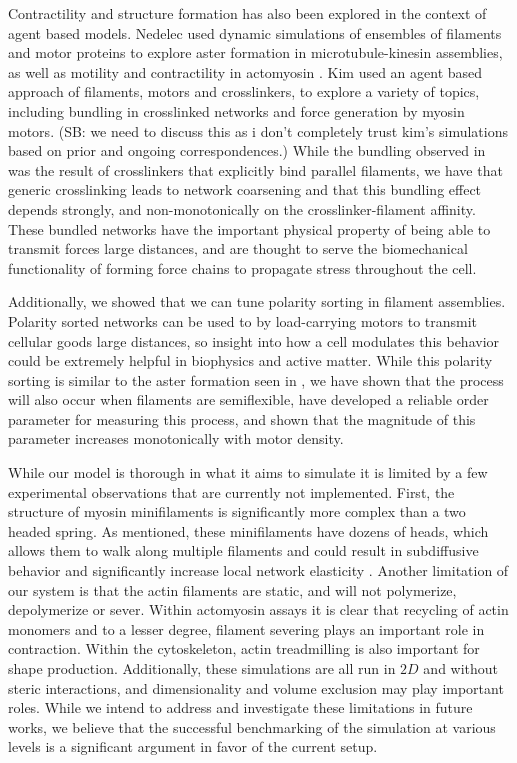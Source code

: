 \documentclass[11pt]{article}
\begin{document}
\par
Contractility and structure formation has also been explored in the context of agent based models. 
Nedelec used dynamic simulations of ensembles of filaments and motor proteins
to explore aster formation in microtubule-kinesin assemblies, as well as motility and contractility in actomyosin
\cite{nedelec2002,nedelec2007,ennomani2016}. 
Kim used an agent based approach of filaments, motors and crosslinkers, to explore a variety of topics, 
including bundling in crosslinked networks and force generation by myosin motors\cite{kim2009b, kim2014}. {\color{blue} (SB: we need to discuss this as i don't completely trust kim's simulations based on prior and ongoing correspondences.)}
While the bundling observed in \cite{kim2009b} was the result of crosslinkers that explicitly bind parallel filaments, 
we have that generic crosslinking leads to network coarsening and that this bundling effect depends strongly, 
and non-monotonically on the crosslinker-filament affinity. These bundled networks have the important physical property of being 
able to transmit forces large distances, and are thought to serve the biomechanical functionality 
of forming force chains to propagate stress throughout the cell. 

\par
Additionally, we showed that we can tune polarity sorting in filament assemblies. 
Polarity sorted networks can be used to by load-carrying motors to 
transmit cellular goods large distances, so insight into how a cell modulates this behavior could be extremely
helpful in biophysics and active matter. While this polarity sorting is similar to the aster formation seen in
\cite{nedelec2002,gordon2012}, we have shown that the process will also occur when filaments are semiflexible, 
have developed a reliable order parameter for measuring this process, and shown that the magnitude of this parameter increases
monotonically with motor density. 

\par
While our model is thorough in what it aims to simulate it is limited by a few experimental observations that are
currently not implemented. First, the structure of myosin minifilaments is significantly more complex than a two headed
spring. As mentioned, these minifilaments have dozens of heads, which allows them to walk along multiple filaments and
could result in subdiffusive behavior \cite{scholz2016} and significantly increase local network elasticity
\cite{murrellTalk}.
Another limitation of our system is that the actin filaments are static, and will not polymerize, depolymerize or
sever. Within actomyosin assays it is clear that recycling of actin monomers and to a lesser degree, filament severing 
plays an important role in contraction\cite{murrell2012}. Within the cytoskeleton, actin treadmilling is also important
for shape production. Additionally, these simulations are all run in $2D$ and without steric interactions, and
dimensionality and volume exclusion may play important roles. 
While we intend to address and investigate these limitations in future works, we believe that the successful
benchmarking of the simulation at various levels is a significant argument in favor of the current setup.
\end{document}
